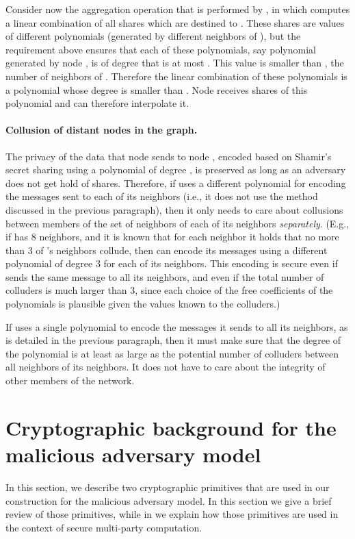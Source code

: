 \documentclass[10pt]{svjour3}
\begin{document}
Consider now  the aggregation operation that is performed by , in which
 computes a linear combination of all shares which are destined to
. These shares are values of different polynomials (generated by
different neighbors of ), but the requirement above ensures  that
 each of
these polynomials, say polynomial  generated by node ,
is of degree that is
at most . This value is smaller than
 , the number of neighbors of
. Therefore the linear combination of these polynomials is a
polynomial whose degree is smaller than . Node  receives 
shares of this polynomial and  can therefore interpolate it.




\paragraph{Collusion of  distant nodes in the graph.}
The privacy of the data that node  sends to node , encoded based
on Shamir's secret sharing using a polynomial of degree , is
preserved as long as an adversary does not get hold of  shares.
Therefore, if  uses a different polynomial for encoding the
messages sent to each of its neighbors (i.e., it does not use the
method discussed in the previous paragraph), then it only needs to
care about collusions between members of the set of neighbors of each
of its neighbors {\em separately}. (E.g., if  has 8 neighbors, and
it is known that for each neighbor  it holds that no more than 3 of
's neighbors collude, then  can encode its messages using a
different polynomial of degree 3 for each of its neighbors. This
encoding is secure even if  sends the same message  to all its
neighbors, and even if the total number of colluders is much larger
than 3, since each choice of the free coefficients of the polynomials
is plausible given the values known to the colluders.)

If  uses a single polynomial to encode the messages it sends to all
its neighbors, as is detailed in the previous paragraph, then it must
make sure that the degree of the polynomial is at least as large as
the potential number of colluders between all neighbors of its
neighbors. It does not have to care about the integrity of other
members of the network.





\section{Cryptographic background for the malicious adversary model}
In this section, we describe two cryptographic primitives that are used
in our construction for the malicious adversary model. In this section we
give a brief review of those primitives, while in  we
explain how those primitives are used in the context of secure multi-party computation.
\end{document}
